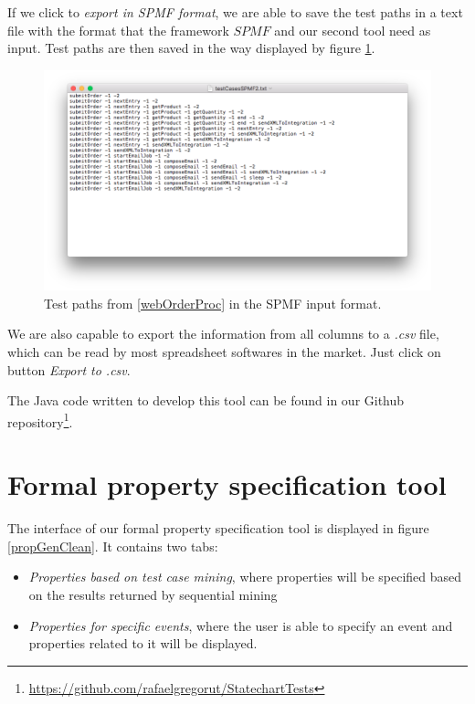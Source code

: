 If we click to \textit{export in SPMF format}, we are able to save the test paths in a text file with the format that the framework $SPMF$ and our second tool need as input. Test paths are then saved in the way displayed by figure \ref{resultsSPMFFile}.

\begin{figure}[htb]
\centering
\includegraphics[width=\textwidth]{figuras/resultsSPMFFile}
\caption{\label{resultsSPMFFile} Test paths from \ref{webOrderProc} in the SPMF input format.}
\end{figure}

We are also capable to export the information from all columns to a \textit{.csv} file, which can be read by most spreadsheet softwares in the market. Just click on button \textit{Export to .csv}.

The Java code written to develop this tool can be found in our Github repository\footnote{\url{https://github.com/rafaelgregorut/StatechartTests}}.

\section{Formal property specification tool}

The interface of our formal property specification tool is displayed in figure \ref{propGenClean}. It contains two tabs: 
\begin{itemize}
\item \textit{Properties based on test case mining}, where properties will be specified based on the results returned by sequential mining
\item \textit{Properties for specific events}, where the user is able to specify an event and properties related to it will be displayed.
\end{itemize}

